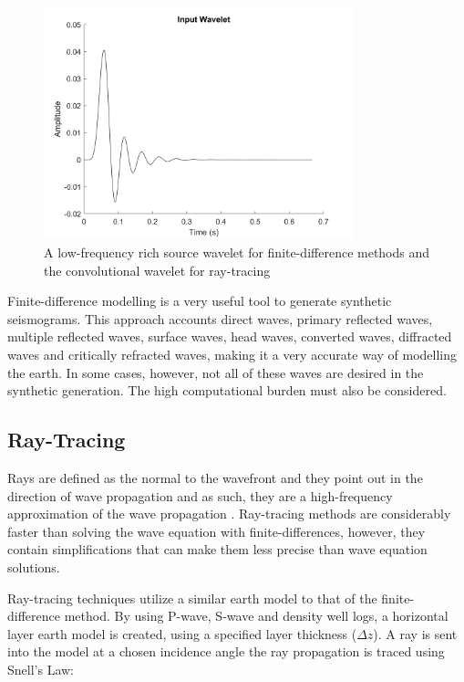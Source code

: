 \documentclass[12pt]{article}
\begin{document}
\begin{figure}[!htb]
	\centering
	\includegraphics[width=0.8\textwidth]{Figures/FD3InputWavelet.png}
	\caption[Finite-difference source and ray-tracing convolution wavelet]{A low-frequency rich source wavelet for finite-difference methods and the convolutional wavelet for ray-tracing}
	\label{fig:3Wavelet}
\end{figure}

	Finite-difference modelling is a very useful tool to generate synthetic seismograms. This approach accounts direct waves, primary reflected waves, multiple reflected waves, surface waves, head waves, converted waves, diffracted waves and critically refracted waves, making it a very accurate way of modelling the earth. In some cases, however, not all of these waves are desired in the synthetic generation. The high computational burden must also be considered. 

\FloatBarrier
\subsection{Ray-Tracing}
	
	Rays are defined as the normal to the wavefront and they point out in the direction of wave propagation and as such, they are a high-frequency approximation of the wave propagation \citep{Hanyga1995}. Ray-tracing methods are considerably faster than solving the wave equation with finite-differences, however, they contain simplifications that can make them less precise than wave equation solutions.
		
	Ray-tracing techniques utilize a similar earth model to that of the finite-difference method. By using P-wave, S-wave and density well logs, a horizontal layer earth model is created, using a specified layer thickness ($\Delta z$). A ray is sent into the model at a chosen incidence angle the ray propagation is traced using Snell's Law: 
\end{document}

